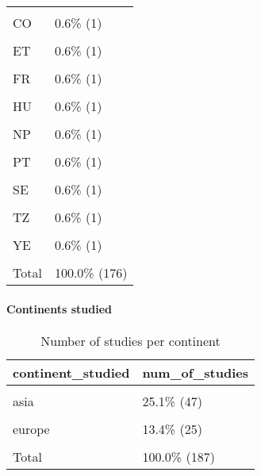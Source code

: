 \documentclass[
]{article}
\begin{document}
\begin{table}[H]
\begin{tabular}[t]{ll}
\cellcolor{gray!6}{CD} & \cellcolor{gray!6}{0.6\%   (1)}\\
CO & 0.6\%   (1)\\
\addlinespace
\cellcolor{gray!6}{CV} & \cellcolor{gray!6}{0.6\%   (1)}\\
ET & 0.6\%   (1)\\
\cellcolor{gray!6}{FO} & \cellcolor{gray!6}{0.6\%   (1)}\\
FR & 0.6\%   (1)\\
\cellcolor{gray!6}{GR} & \cellcolor{gray!6}{0.6\%   (1)}\\
\addlinespace
HU & 0.6\%   (1)\\
\cellcolor{gray!6}{IS} & \cellcolor{gray!6}{0.6\%   (1)}\\
NP & 0.6\%   (1)\\
\cellcolor{gray!6}{PH} & \cellcolor{gray!6}{0.6\%   (1)}\\
PT & 0.6\%   (1)\\
\addlinespace
\cellcolor{gray!6}{SD} & \cellcolor{gray!6}{0.6\%   (1)}\\
SE & 0.6\%   (1)\\
\cellcolor{gray!6}{TD} & \cellcolor{gray!6}{0.6\%   (1)}\\
TZ & 0.6\%   (1)\\
\cellcolor{gray!6}{VE} & \cellcolor{gray!6}{0.6\%   (1)}\\
\addlinespace
YE & 0.6\%   (1)\\
\cellcolor{gray!6}{ZM} & \cellcolor{gray!6}{0.6\%   (1)}\\
Total & 100.0\% (176)\\
\bottomrule
\end{tabular}
\end{table}

\hypertarget{continents-studied}{%
\paragraph{Continents studied}\label{continents-studied}}

\begin{table}[H]

\caption{\label{tab:unnamed-chunk-15}Number of studies per continent}
\centering
\begin{tabular}[t]{ll}
\toprule
continent\_studied & num\_of\_studies\\
\midrule
\cellcolor{gray!6}{americas} & \cellcolor{gray!6}{36.4\%  (68)}\\
asia & 25.1\%  (47)\\
\cellcolor{gray!6}{africa} & \cellcolor{gray!6}{24.6\%  (46)}\\
europe & 13.4\%  (25)\\
\cellcolor{gray!6}{oceania} & \cellcolor{gray!6}{0.5\%   (1)}\\
\addlinespace
Total & 100.0\% (187)\\
\bottomrule
\end{tabular}
\end{table}
\end{document}
